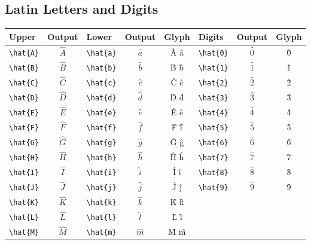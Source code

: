 \documentclass[12pt,a4paper]{article}
\begin{document}
\subsection*{Latin Letters and Digits}
\begin{longtable}{|l|c|l|c|c|l|c|c|}
\hline
\textbf{Upper} & \textbf{Output} & \textbf{Lower} & \textbf{Output} & \textbf{Glyph} & \textbf{Digits} & \textbf{Output} & \textbf{Glyph} \\
\hline
\verb|\hat{A}| & $\hat{A}$       & \verb|\hat{a}| & $\hat{a}$       & Â â            & \verb|\hat{0}|  & $\hat{0}$       & 0̂ \\
\verb|\hat{B}| & $\hat{B}$       & \verb|\hat{b}| & $\hat{b}$       & B̂ b̂            & \verb|\hat{1}|  & $\hat{1}$       & 1̂ \\
\verb|\hat{C}| & $\hat{C}$       & \verb|\hat{c}| & $\hat{c}$       & Ĉ ĉ            & \verb|\hat{2}|  & $\hat{2}$       & 2̂ \\
\verb|\hat{D}| & $\hat{D}$       & \verb|\hat{d}| & $\hat{d}$       & D̂ d̂            & \verb|\hat{3}|  & $\hat{3}$       & 3̂ \\
\verb|\hat{E}| & $\hat{E}$       & \verb|\hat{e}| & $\hat{e}$       & Ê ê            & \verb|\hat{4}|  & $\hat{4}$       & 4̂ \\
\verb|\hat{F}| & $\hat{F}$       & \verb|\hat{f}| & $\hat{f}$       & F̂ f̂            & \verb|\hat{5}|  & $\hat{5}$       & 5̂ \\
\verb|\hat{G}| & $\hat{G}$       & \verb|\hat{g}| & $\hat{g}$       & Ĝ ĝ            & \verb|\hat{6}|  & $\hat{6}$       & 6̂ \\
\verb|\hat{H}| & $\hat{H}$       & \verb|\hat{h}| & $\hat{h}$       & Ĥ ĥ            & \verb|\hat{7}|  & $\hat{7}$       & 7̂ \\
\verb|\hat{I}| & $\hat{I}$       & \verb|\hat{i}| & $\hat{i}$       & Î î            & \verb|\hat{8}|  & $\hat{8}$       & 8̂ \\
\verb|\hat{J}| & $\hat{J}$       & \verb|\hat{j}| & $\hat{j}$       & Ĵ ĵ            & \verb|\hat{9}|  & $\hat{9}$       & 9̂ \\
\verb|\hat{K}| & $\hat{K}$       & \verb|\hat{k}| & $\hat{k}$       & K̂ k̂            &                 &                 & \\
\verb|\hat{L}| & $\hat{L}$       & \verb|\hat{l}| & $\hat{l}$       & L̂ l̂            &                 &                 & \\
\verb|\hat{M}| & $\hat{M}$       & \verb|\hat{m}| & $\hat{m}$       & M̂ m̂            &                 &                 & \\

\end{longtable}
\end{document}
